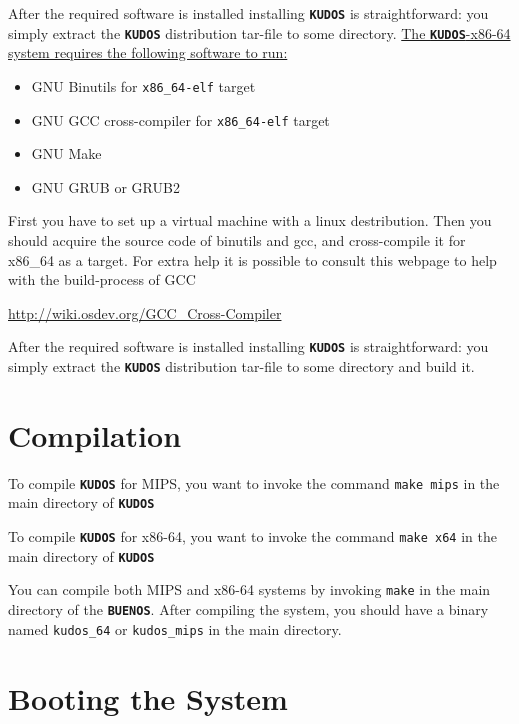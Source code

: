 \documentclass[twoside,a4paper]{report}
\newcommand{\buenos}{\texttt{\textbf{BUENOS}}}
\newcommand{\kudos}{\texttt{\textbf{KUDOS}}}
\begin{document}
After the required software is installed installing \kudos{} is
straightforward: you simply extract the \kudos{} distribution tar-file
to some directory.
\newline 
\newline
\underline{The \kudos{}-x86-64 system requires the following software to run:}
\begin{itemize}
\item GNU Binutils for \texttt{x86\_64-elf} target
\item GNU GCC cross-compiler for \texttt{x86\_64-elf} target
\item GNU Make
\item GNU GRUB or GRUB2
\end{itemize}

First you have to set up a virtual machine with a linux destribution. Then you should
acquire the source code of binutils and gcc, and cross-compile it for x86\_64 as a target.
For extra help it is possible to consult this webpage to help with the build-process of GCC

\vspace{\baselineskip}
\url{http://wiki.osdev.org/GCC_Cross-Compiler}
\vspace{\baselineskip}

After the required software is installed installing \kudos{} is
straightforward: you simply extract the \kudos{} distribution tar-file
to some directory and build it.

\section{Compilation}
\label{sec:compiling}

To compile \kudos{} for MIPS, you want to invoke the command 
\texttt{make mips} in the main directory of \kudos{}

To compile \kudos{} for x86-64, you want to invoke the command 
\texttt{make x64} in the main directory of \kudos{}

You can compile both MIPS and x86-64 systems  by invoking \texttt{make} in the
main directory of the \buenos{}. After compiling the system, you should have a binary named
\texttt{kudos\_64} or \texttt{kudos\_mips} in the main directory.

\section{Booting the System}
\label{sec:booting}
\end{document}
